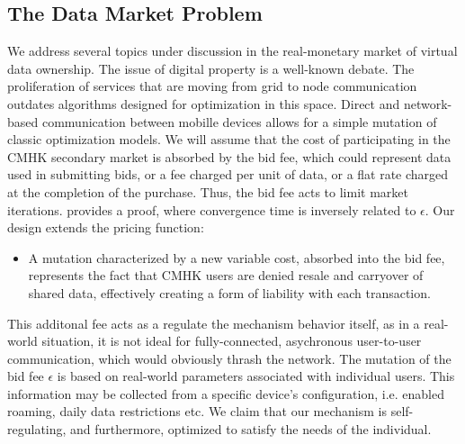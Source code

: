 \documentclass[sigconf, anonymous]{acmart}
\theoremstyle{definition}
\begin{document}
\subsection{The Data Market Problem}

We address several topics under discussion in the real-monetary market of virtual
data ownership. The issue of digital property is a well-known debate. The
proliferation of services that are moving from grid to node communication
outdates algorithms designed for optimization in this space. Direct and
network-based communication between mobille devices allows for a simple
mutation of classic optimization models. We will assume that the cost of participating in the CMHK secondary market is
absorbed by the bid fee, which could represent data used in submitting bids, or
a fee charged per unit of data, or a flat rate charged at the completion of the
purchase. Thus, the bid fee acts to limit market iterations. \cite{semret}
provides a proof, where convergence time is inversely related to $\epsilon$.
Our design extends the pricing function:
\begin{itemize}
    \item A mutation characterized by a new variable cost, absorbed into the bid fee,
        represents the
        fact that CMHK users are denied resale and carryover of shared data, effectively creating
        a form of liability with each transaction. 
\end{itemize}
This additonal fee acts as a regulate the mechanism behavior itself, as in a
real-world situation, it is not ideal for fully-connected, asychronous
user-to-user communication, which would obviously thrash the network. The
mutation of the bid fee $\epsilon$ is based on real-world parameters associated
with individual users. This information may be collected from a specific
device's configuration, i.e. enabled roaming, daily data restrictions etc.
We claim that our mechanism is self-regulating, and furthermore, optimized to satisfy the
needs of the individual.
\end{document}
